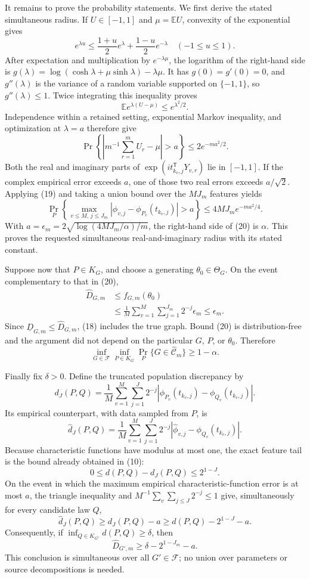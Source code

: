 It remains to prove the probability statements.  We first derive the stated
simultaneous radius.  If \(U\in[-1,1]\) and \(\mu=\mathbb EU\), convexity of
the exponential gives
\[
 e^{\lambda u}\leq\frac{1+u}{2}e^\lambda
                     +\frac{1-u}{2}e^{-\lambda}
 \quad(-1\leq u\leq1).
\]
After expectation and multiplication by \(e^{-\lambda\mu}\), the logarithm
of the right-hand side is
\(g(\lambda)=\log(\cosh\lambda+\mu\sinh\lambda)-\lambda\mu\).
It has \(g(0)=g'(0)=0\), and \(g''(\lambda)\) is the variance of a random
variable supported on \(\{-1,1\}\), so \(g''(\lambda)\leq1\).  Twice
integrating this inequality proves
\[
 \mathbb E e^{\lambda(U-\mu)}\leq e^{\lambda^2/2}.
\]
Independence within a retained setting, exponential Markov inequality, and
optimization at \(\lambda=a\) therefore give
\[
 \Pr\left\{\left|m^{-1}\sum_{r=1}^mU_r-\mu\right|>a\right\}
 \leq2e^{-ma^2/2}.
 \tag{19}
\]
Both the real and imaginary parts of
\(\exp(i t_{k_v,j}^{\mathsf T}Y_{v,r})\) lie in \([-1,1]\).  If the complex
empirical error exceeds \(a\), one of those two real errors exceeds
\(a/\sqrt2\).  Applying (19) and taking a union bound over the \(MJ_m\)
features yields
\[
 \Pr_P\left\{
   \max_{v\leq M,\,j\leq J_m}
   |\widehat\phi_{v,j}-\phi_{P_v}(t_{k_v,j})|>a
 \right\}
 \leq4MJ_m e^{-ma^2/4}.
 \tag{20}
\]
With
\(a=\epsilon_m=2\sqrt{\log(4MJ_m/\alpha)/m}\), the right-hand side of
(20) is \(\alpha\).  This proves the requested simultaneous
real-and-imaginary radius with its stated constant.

Suppose now that \(P\in K_G\), and choose a generating
\(\theta_0\in\Theta_G\).  On the event complementary to that in (20),
\[
 \begin{split}
 \widehat D_{G,m}
 &\leq f_{G,m}(\theta_0)\\
 &\leq\frac1M\sum_{v=1}^M\sum_{j=1}^{J_m}2^{-j}\epsilon_m
 \leq\epsilon_m.
 \end{split}
 \tag{21}
\]
Since \(\underline D_{G,m}\leq\widehat D_{G,m}\), (18) includes the true
graph.  Bound (20) is distribution-free and the argument did not depend on
the particular \(G\), \(P\), or \(\theta_0\).  Therefore
\[
 \inf_{G\in\mathcal F}\inf_{P\in K_G}
 \Pr_P\{G\in\widehat{\mathcal C}_m\}\geq1-\alpha.
 \tag{22}
\]

Finally fix \(\delta>0\).  Define the truncated population discrepancy by
\[
 d_J(P,Q)=\frac1M\sum_{v=1}^M\sum_{j=1}^{J}2^{-j}
 |\phi_{P_v}(t_{k_v,j})-\phi_{Q_v}(t_{k_v,j})|.
\]
Its empirical counterpart, with data sampled from \(P\), is
\[
 \widehat d_J(P,Q)=\frac1M\sum_{v=1}^M\sum_{j=1}^{J}2^{-j}
 |\widehat\phi_{v,j}-\phi_{Q_v}(t_{k_v,j})|.
\]
Because characteristic functions have modulus at most one, the exact feature
tail is the bound already obtained in (10):
\[
 0\leq d(P,Q)-d_J(P,Q)\leq2^{1-J}.
 \tag{23}
\]
On the event in which the maximum empirical characteristic-function error is
at most \(a\), the triangle inequality and
\(M^{-1}\sum_v\sum_{j\leq J}2^{-j}\leq1\) give, simultaneously for every
candidate law \(Q\),
\[
 \widehat d_J(P,Q)\geq d_J(P,Q)-a
 \geq d(P,Q)-2^{1-J}-a.
 \tag{24}
\]
Consequently, if
\(\inf_{Q\in K_{G'}}d(P,Q)\geq\delta\), then
\[
 \widehat D_{G',m}
 \geq\delta-2^{1-J_m}-a.
 \tag{25}
\]
This conclusion is simultaneous over all \(G'\in\mathcal F\); no union over
parameters or source decompositions is needed.

